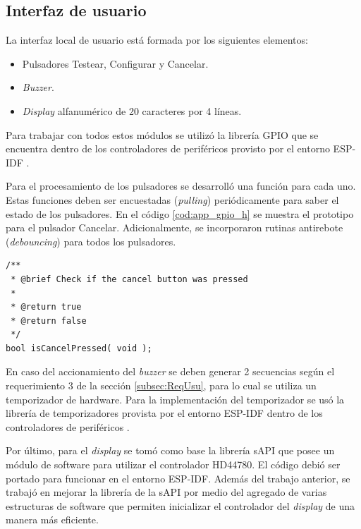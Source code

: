 \subsection{Interfaz de usuario}

La interfaz local de usuario está formada por los siguientes elementos:
\begin{itemize}
\item Pulsadores Testear, Configurar y Cancelar.
\item \textit{Buzzer}.
\item \textit{Display} alfanumérico de 20 caracteres por 4 líneas.
\end{itemize}

Para trabajar con todos estos módulos se utilizó la librería GPIO que se encuentra dentro de los controladores de periféricos provisto por el entorno ESP-IDF \citep{ESPIDF:PER}.

Para el procesamiento de los pulsadores se desarrolló una función para cada uno. Estas funciones deben ser encuestadas (\textit{pulling}) periódicamente para saber el estado de los pulsadores. En el código \ref{cod:app_gpio_h} se muestra el prototipo para el pulsador Cancelar. Adicionalmente, se incorporaron rutinas antirebote (\textit{debouncing}) para todos los pulsadores.

\begin{lstlisting}[label=cod:app_gpio_h,caption=Pseudocódigo del módulo adc.c.]
/**
 * @brief Check if the cancel button was pressed
 * 
 * @return true 
 * @return false 
 */
bool isCancelPressed( void );
\end{lstlisting}

En caso del accionamiento del \textit{buzzer} se deben generar 2 secuencias según el requerimiento 3 de la sección \ref{subsec:ReqUsu}, para lo cual se utiliza un temporizador de hardware. Para la implementación del temporizador se usó la librería de temporizadores provista por el entorno ESP-IDF dentro de los controladores de periféricos \citep{ESPIDF:PER}.

Por último, para el \textit{display} se tomó como base la librería sAPI \citep{sAPI} que posee un módulo de software para utilizar el controlador HD44780. El código debió ser portado para funcionar en el entorno ESP-IDF. Además del trabajo anterior, se trabajó en mejorar la librería de la sAPI por medio del agregado de varias estructuras de software que permiten inicializar el controlador del \textit{display} de una manera más eficiente.

